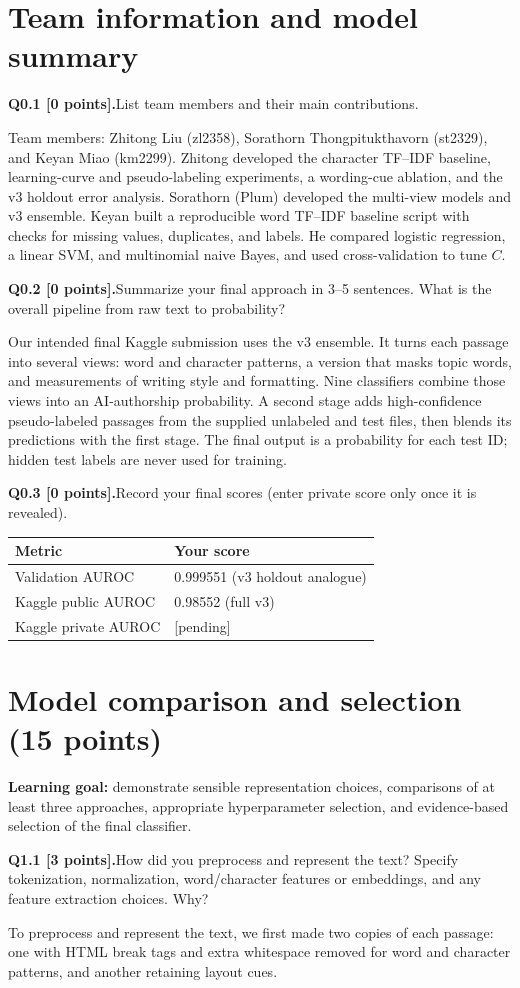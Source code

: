 \documentclass[11pt,letterpaper]{article}
\newcommand{\question}[2]{\needspace{4\baselineskip}\par\addvspace{0.45em}\noindent\textbf{#1}\quad #2\par\nobreak\vspace{0.1em}}
\begin{document}
\section{Team information and model summary}
\question{Q0.1 [0 points].}{List team members and their main contributions.}
Team members: Zhitong Liu (zl2358), Sorathorn Thongpitukthavorn (st2329), and Keyan Miao (km2299). Zhitong developed the character TF--IDF baseline, learning-curve and pseudo-labeling experiments, a wording-cue ablation, and the v3 holdout error analysis. Sorathorn (Plum) developed the multi-view models and v3 ensemble. Keyan built a reproducible word TF--IDF baseline script with checks for missing values, duplicates, and labels. He compared logistic regression, a linear SVM, and multinomial naive Bayes, and used cross-validation to tune $C$.
\question{Q0.2 [0 points].}{Summarize your final approach in 3--5 sentences. What is the overall pipeline from raw text to probability?}
Our intended final Kaggle submission uses the v3 ensemble. It turns each passage into several views: word and character patterns, a version that masks topic words, and measurements of writing style and formatting. Nine classifiers combine those views into an AI-authorship probability. A second stage adds high-confidence pseudo-labeled passages from the supplied unlabeled and test files, then blends its predictions with the first stage. The final output is a probability for each test ID; hidden test labels are never used for training.
\question{Q0.3 [0 points].}{Record your final scores (enter private score only once it is revealed).}
\begin{tabularx}{\linewidth}{@{}Yp{1.8in}@{}}\toprule Metric & Your score \\ \midrule Validation AUROC & 0.999551 (v3 holdout analogue) \\ Kaggle public AUROC & 0.98552 (full v3) \\ Kaggle private AUROC & [pending] \\ \bottomrule\end{tabularx}
\newpage
\section{Model comparison and selection (15 points)}
\textbf{Learning goal:} demonstrate sensible representation choices, comparisons of at least three approaches, appropriate hyperparameter selection, and evidence-based selection of the final classifier.

\question{Q1.1 [3 points].}{How did you preprocess and represent the text? Specify tokenization, normalization, word/character features or embeddings, and any feature extraction choices. Why?}
To preprocess and represent the text, we first made two copies of each passage: one with HTML break tags and extra whitespace removed for word and character patterns, and another retaining layout cues.
\newline
\end{document}
